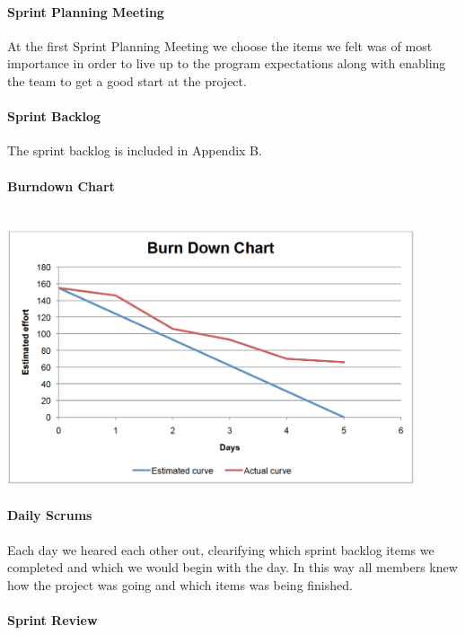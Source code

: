 \documentclass[a4paper,11pt,report]{report}
\begin{document}
			\paragraph{Sprint Planning Meeting}
			At the first Sprint Planning Meeting we choose the items we felt was of most importance in order to live up to the program expectations along with enabling the team to get a good start at the project.

			\paragraph{Sprint Backlog}
			The sprint backlog is included in Appendix B.
			\paragraph{Burndown Chart}
				\mbox{}\\
				\includegraphics[width=12cm]{./Sprint1BurnDownChart.png}
			\paragraph{Daily Scrums}
		Each day we heared each other out, clearifying which sprint backlog items we completed and which we would begin with the day. In this way all members knew how the project was going and which items was being finished.
			\paragraph{Sprint Review}
\end{document}
